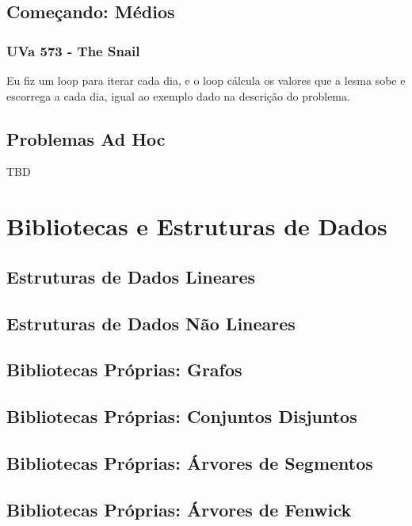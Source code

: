 \documentclass[11pt]{scrartcl}
\begin{document}
\subsection{Começando: Médios}

\subsubsection{UVa 573 - The Snail}
Eu fiz um loop para iterar cada dia, e o loop cálcula os valores que a lesma sobe e escorrega a cada dia, igual ao exemplo dado na descrição do problema.


\subsection{Problemas Ad Hoc}

TBD

\section{Bibliotecas e Estruturas de Dados}

\subsection{Estruturas de Dados Lineares}

\subsection{Estruturas de Dados Não Lineares}

\subsection{Bibliotecas Próprias: Grafos}

\subsection{Bibliotecas Próprias: Conjuntos Disjuntos}

\subsection{Bibliotecas Próprias: Árvores de Segmentos}

\subsection{Bibliotecas Próprias: Árvores de Fenwick}
\end{document}
